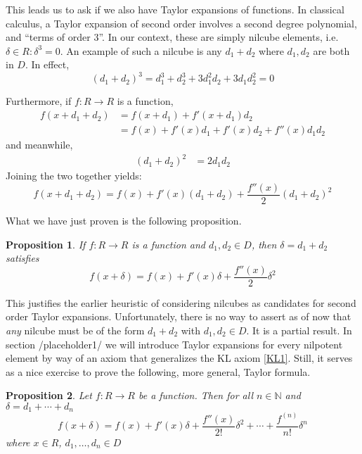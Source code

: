 \documentclass[11pt]{article}
\newtheorem{proposition}{Proposition}[section]
\theoremstyle{definition}
\numberwithin{equation}{section}
\begin{document}
This leads us to ask if we also have Taylor expansions of functions. In classical calculus, a Taylor expansion of second order involves a second degree polynomial, and ``terms of order 3''. In our context, these are simply nilcube elements, i.e. \( \delta\in R : \delta^3 = 0 \). An example of such a nilcube is any \( d_1+d_2 \) where \( d_1,d_2 \) are both in \( D \). In effect,
\[
  (d_1+d_2)^3 = d_1^3 + d_2^3 + 3d_1^2d_2 + 3d_1d_2^2 = 0
\]

Furthermore, if \( f:R\to R\) is a function, 
\begin{align*}
  f(x+d_1+d_2) & = f(x+d_1)+f'(x+d_1)d_2 \\
               & = f(x) + f'(x)d_1 + f'(x)d_2 + f''(x)d_1d_2
\end{align*}
and meanwhile,
\begin{align*}
  (d_1+d_2)^2 & = 2d_1d_2
\end{align*}
Joining the two together yields:
\[
  f(x+d_1+d_2) = f(x) + f'(x)(d_1+d_2) + \frac{f''(x)}{2}(d_1+d_2)^2
\]

What we have just proven is the following proposition.
\begin{proposition}
  If \( f:R\to R \) is a function and \( d_1,d_2\in D \), then \( \delta = d_1+d_2 \) satisfies
  \[
    f(x+\delta) = f(x) + f'(x)\delta + \frac{f''(x)}{2}\delta^2
  \]

\end{proposition}

This justifies the earlier heuristic of considering nilcubes as candidates for second order Taylor expansions. Unfortunately, there is no way to assert as of now that \textit{any} nilcube must be of the form \( d_1+d_2 \) with \( d_1,d_2\in D \). It is a partial result. In section {/placeholder1/} we will introduce Taylor expansions for every nilpotent element by way of an axiom that generalizes the KL axiom \ref{KL1}. Still, it serves as a nice exercise to prove the following, more general, Taylor formula.

\begin{proposition}
  Let \( f:R\to R \) be a function. Then for all \( n\in\mathbb N \) and \( \delta = d_1+\cdots+d_n \)
  \[
    f(x+\delta) = f(x) + f'(x)\delta + \frac{f''(x)}{2!}\delta^2 + \cdots + \frac{f^{(n)}}{n!}\delta^n
  \]
  where \( x\in R \), \( d_1,\dots,d_n\in D \)
\end{proposition}
\end{document}

